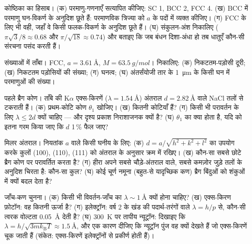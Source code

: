 \begin{exercise}[$\star$]\label{exo:b3:crystalline-solids:1}
कोष्ठिका का हिसाब। (क) परमाणु-गणनाएँ सत्यापित कीजिए: SC 1, BCC 2,
FCC 4. (ख) BCC में परमाणु घन-विकर्ण के अनुदिश छूते हैं: परमाणविक
त्रिज्या को $a$ के पदों में व्यक्त कीजिए। (ग) FCC के लिए भी वही, जहाँ
वे किसी फलक-विकर्ण के अनुदिश छूते हैं। (घ) संकुलन-अंश निकालिए
($\pi\sqrt3/8 \approx 0.68$ और $\pi/\sqrt{18} \approx 0.74$) और
बताइए कि जब बंधन दिशा-अंधा हो तब धातुएँ कौन-सी संरचना पसंद करती हैं।
\end{exercise}

\begin{exercise}[$\star$]\label{exo:b3:crystalline-solids:2}
संख्याओं में ताँबा। FCC, $a = \qty{3.61}{\angstrom}$, $M =
\qty{63.5}{g/mol}$। निकालिए: (क) निकटतम-पड़ोसी दूरी;
(ख) निकटतम पड़ोसियों की संख्या; (ग) घनत्व; (घ) अंतर्संयोजी तार के
\qty{1}{\micro m} के किसी घन में परमाणुओं की संख्या।
\end{exercise}

\begin{exercise}[$\star$]\label{exo:b3:crystalline-solids:3}
पहले ब्रैग कोण। ताँबे की K$\alpha$ एक्स-किरणें
($\lambda = \qty{1.54}{\angstrom}$) अंतराल
$d = \qty{2.82}{\angstrom}$ वाले NaCl तलों से टकराती हैं। (क)
प्रथम-कोटि कोण $\theta_1$ खोजिए। (ख) कितनी कोटियाँ हैं? (ग) किसी भी
परावर्तन के लिए $\lambda \le 2d$ क्यों चाहिए --- और दृश्य प्रकाश
निराशाजनक क्यों है? (घ) $\theta_1$ का क्या होता है, यदि  को
इतना गरम किया जाए कि $d$ 1\,\% फैल जाए?
\end{exercise}

\begin{exercise}[$\star$]\label{exo:b3:crystalline-solids:4}
मिलर अंतराल। नियतांक $a$ वाले किसी घनीय  के लिए: (क)
$d = a/\sqrt{h^2+k^2+l^2}$ का उपयोग करके कुलों (100), (110), (111)
को अंतराल के अनुसार क्रम में रखिए। (ख) कौन-सा सबसे छोटे
ब्रैग कोण पर परावर्तित करता है? (ग) हीरा अपने सबसे चौड़े-अंतराल वाले,
सबसे कमज़ोर जुड़े तलों के अनुदिश चिरता है: कौन-सा कुल? (घ) कोई चूर्ण
नमूना (बहुत-से यादृच्छिक कण) ब्रैग बिंदुओं को शंकुओं में क्यों बदल
देता है?
\end{exercise}

\begin{exercise}[$\star\star$]\label{exo:b3:crystalline-solids:5}
जाँच-कण चुनना। (क) किसी भी विवर्तन-जाँच का
$\lambda \sim \qty{1}{\angstrom}$ क्यों होना चाहिए? (ख) एक्स-किरण
फ़ोटॉन: वह कितनी ऊर्जा है? (ग) इलेक्ट्रॉन: वर्ष 2 के खंड की
पदार्थ-तरंगों वाले $\lambda = h/p$ से, कौन-सी त्वरक वोल्टता
\qty{0.05}{\angstrom} देती है? (घ) \qty{300}{K} पर तापीय न्यूट्रॉन:
दिखाइए कि $\lambda = h/\sqrt{3mk_{\text{B}}T} \approx \qty{1.5}{\angstrom}$,
और एक कारण दीजिए कि न्यूट्रॉन पुंज वह क्यों देखते हैं जो एक्स-किरणें
चूक जाती हैं (संकेत: एक्स-किरणें इलेक्ट्रॉनों से प्रकीर्ण होती हैं)।
\end{exercise}

